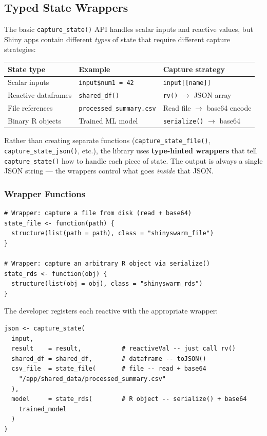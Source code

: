 \documentclass[11pt,a4paper]{article}
\begin{document}
\subsection{Typed State Wrappers}

The basic \texttt{capture\_state()} API handles scalar inputs and reactive values,
but Shiny apps contain different \emph{types} of state that require different
capture strategies:

\begin{center}
\begin{tabular}{lll}
\textbf{State type} & \textbf{Example} & \textbf{Capture strategy} \\
\hline
Scalar inputs & \texttt{input\$num1 = 42} & \texttt{input[[name]]} \\
Reactive dataframes & \texttt{shared\_df()} & \texttt{rv()} $\to$ JSON array \\
File references & \texttt{processed\_summary.csv} & Read file $\to$ base64 encode \\
Binary R objects & Trained ML model & \texttt{serialize()} $\to$ base64 \\
\end{tabular}
\end{center}

Rather than creating separate functions (\texttt{capture\_state\_file()},
\texttt{capture\_state\_json()}, etc.), the library uses \textbf{type-hinted
wrappers} that tell \texttt{capture\_state()} how to handle each piece of state.
The output is always a single JSON string --- the wrappers control what goes
\emph{inside} that JSON.

\subsubsection{Wrapper Functions}

\begin{verbatim}
# Wrapper: capture a file from disk (read + base64)
state_file <- function(path) {
  structure(list(path = path), class = "shinyswarm_file")
}

# Wrapper: capture an arbitrary R object via serialize()
state_rds <- function(obj) {
  structure(list(obj = obj), class = "shinyswarm_rds")
}
\end{verbatim}

The developer registers each reactive with the appropriate wrapper:

\begin{verbatim}
json <- capture_state(
  input,
  result    = result,           # reactiveVal -- just call rv()
  shared_df = shared_df,        # dataframe -- toJSON()
  csv_file  = state_file(       # file -- read + base64
    "/app/shared_data/processed_summary.csv"
  ),
  model     = state_rds(        # R object -- serialize() + base64
    trained_model
  )
)
\end{verbatim}
\end{document}
